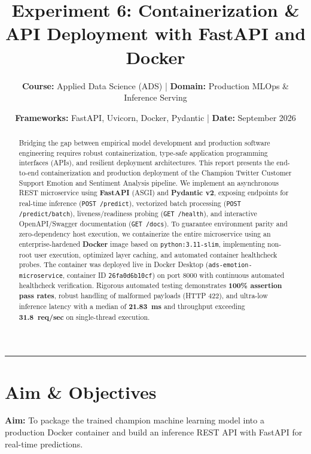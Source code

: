 \documentclass[11pt, a4paper]{article}
\title{\textbf{Experiment 6: Containerization \& API Deployment with FastAPI and Docker}}
\author{\textbf{Course:} Applied Data Science (ADS) \quad | \quad \textbf{Domain:} Production MLOps \& Inference Serving}
\date{\textbf{Frameworks:} FastAPI, Uvicorn, Docker, Pydantic \quad | \quad \textbf{Date:} September 2026}
\begin{document}
\maketitle

\begin{abstract}
Bridging the gap between empirical model development and production software engineering requires robust containerization, type-safe application programming interfaces (APIs), and resilient deployment architectures. This report presents the end-to-end containerization and production deployment of the Champion Twitter Customer Support Emotion and Sentiment Analysis pipeline. We implement an asynchronous REST microservice using \textbf{FastAPI} (ASGI) and \textbf{Pydantic v2}, exposing endpoints for real-time inference (\texttt{POST /predict}), vectorized batch processing (\texttt{POST /predict/batch}), liveness/readiness probing (\texttt{GET /health}), and interactive OpenAPI/Swagger documentation (\texttt{GET /docs}). To guarantee environment parity and zero-dependency host execution, we containerize the entire microservice using an enterprise-hardened \textbf{Docker} image based on \texttt{python:3.11-slim}, implementing non-root user execution, optimized layer caching, and automated container healthcheck probes. The container was deployed live in Docker Desktop (\texttt{ads-emotion-microservice}, container ID \texttt{26fa0d6b10cf}) on port 8000 with continuous automated healthcheck verification. Rigorous automated testing demonstrates \textbf{100\% assertion pass rates}, robust handling of malformed payloads (HTTP 422), and ultra-low inference latency with a median of \textbf{21.83~ms} and throughput exceeding \textbf{31.8~req/sec} on single-thread execution.
\end{abstract}

\vspace{0.5em}
\hrule
\vspace{1em}

\section{Aim \& Objectives}
\textbf{Aim:} To package the trained champion machine learning model into a production Docker container and build an inference REST API with FastAPI for real-time predictions.
\end{document}
